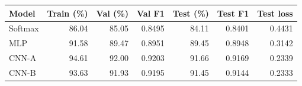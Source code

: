 \begin{tabular}{lrrrrrr}
\toprule
Model & Train (\%) & Val (\%) & Val F1 & Test (\%) & Test F1 & Test loss\\
\midrule
Softmax & 86.04 & 85.05 & 0.8495 & 84.11 & 0.8401 & 0.4431\\
MLP & 91.58 & 89.47 & 0.8951 & 89.45 & 0.8948 & 0.3142\\
CNN-A & 94.61 & 92.00 & 0.9203 & 91.66 & 0.9169 & 0.2339\\
CNN-B & 93.63 & 91.93 & 0.9195 & 91.45 & 0.9144 & 0.2333\\
\bottomrule
\end{tabular}
